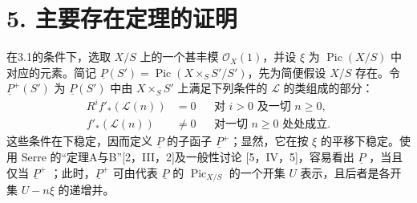 \section*{5. 主要存在定理的证明}
在3.1的条件下，选取 $X/S$ 上的一个甚丰模 $\mathcal O_X(1)$，并设 $\xi$ 为 $\operatorname{Pic}(X/S)$ 中对应的元素。简记 $\underline P(S')=\operatorname{Pic}(X\times_S S'/S')$，先为简便假设 $X/S$ 存在。令 $\underline P^+(S')$ 为 $\underline P(S')$ 中由 $X\times_S S'$ 上满足下列条件的 $\mathcal L$ 的类组成的部分：
\begin{align*}
R^if'_*(\mathcal L(n))&=0&&\text{对 }i>0\text{ 及一切 }n\geq0,\\
f'_*(\mathcal L(n))&\ne0&&\text{对一切 }n\geq0\text{ 处处成立}.
\end{align*}
这些条件在下稳定，因而定义 $\underline P$ 的子函子 $\underline P^+$；显然，它在按 $\xi$ 的平移下稳定。使用 Serre 的“定理A与B”[2，III，2]及一般性讨论 [5，IV，5]，容易看出 $\underline P$ ，当且仅当 $\underline P^+$ ；此时，$\underline P^+$ 可由代表 $\underline P$ 的 $\operatorname{Pic}_{X/S}$ 的一个开集 $U$ 表示，且后者是各开集 $U-n\xi$ 的递增并。

